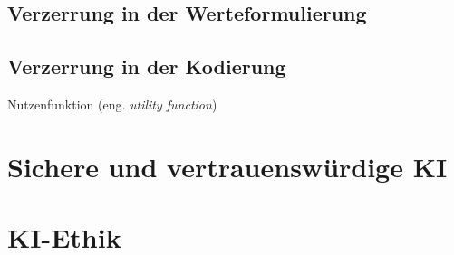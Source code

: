 \subsection{Verzerrung in der Werteformulierung}
\subsection{Verzerrung in der Kodierung}
Nutzenfunktion (eng. \emph{utility function})
\section{Sichere und vertrauenswürdige KI}
\section{KI-Ethik}

